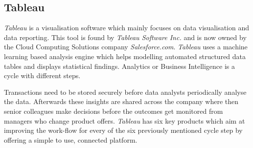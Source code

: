 \documentclass[../paper.tex]{subfiles}
\begin{document}
\subsection{Tableau}

\textit{Tableau} is a visualisation software which mainly focuses on data visualisation and data reporting. This tool is found by \textit{Tableau Software  Inc.} and is now owned by the Cloud Computing Solutions company \textit{Salesforce.com}. \textit{Tableau} uses a machine learning based analysis engine which helps modelling  automated structured data tables and displays statistical findings. Analytics or Business Intelligence is a cycle with different steps.

Transactions need to be stored securely before data analysts periodically analyse the data. Afterwards these insights are shared across the company where then senior colleagues make decisions before the outcomes get monitored from managers who change product offers. \textit{Tableau} has six key products which aim at improving the work-flow for every of the six previously mentioned cycle step by offering a simple to use, connected platform.
\end{document}
